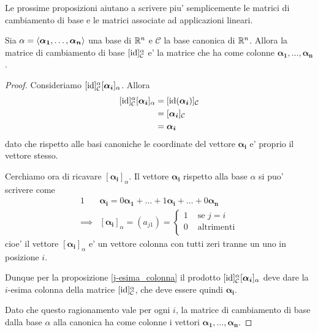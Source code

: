 Le prossime proposizioni aiutano a scrivere piu' semplicemente le matrici di cambiamento di base e le matrici associate ad applicazioni lineari.

\begin{proposition}
    Sia $\alpha = \left\langle \bm{\alpha_1}, \dots, \bm{\alpha_n} \right\rangle$ una base di $\mathbb{R}^n$ e $\mathcal{C}$ la base canonica di $\mathbb{R}^n$. Allora la matrice di cambiamento di base $[\operatorname{id}]^{\alpha}_{\mathcal{C}}$ e' la matrice che ha come colonne $\bm{\alpha_1}, \dots, \bm{\alpha_n}$.
\end{proposition}
\begin{proof}
    Consideriamo $[\operatorname{id}]^{\alpha}_{\mathcal{C}} [\bm{\alpha_i}]_{\alpha}$. Allora \begin{alignat*}
        {1}
        [\operatorname{id}]^{\alpha}_{\mathcal{C}} [\bm{\alpha_i}]_{\alpha} &= [\operatorname{id}(\bm{\alpha_i})]_{\mathcal{C}} \\
        &= [\bm{\alpha_i}]_{\mathcal{C}}\\
        &= \bm{\alpha_i}
    \end{alignat*} dato che rispetto alle basi canoniche le coordinate del vettore $\bm{\alpha_i}$ e' proprio il vettore stesso.
    
    Cerchiamo ora di ricavare $[\bm{\alpha_i}]_{\alpha}$. Il vettore $\bm{\alpha_i}$ rispetto alla base $\alpha$ si puo' scrivere come \begin{alignat*}
        {1}
        &\bm{\alpha_i} = 0\bm{\alpha_1} + \dots + 1\bm{\alpha_i} + \dots + 0\bm{\alpha_n} \\
        \implies &[\bm{\alpha_i}]_{\alpha} = (a_{j1}) = \begin{cases}
            1 & \text{ se } j = i\\
            0 & \text{ altrimenti}\\
        \end{cases}
    \end{alignat*}
    cioe' il vettore $[\bm{\alpha_i}]_{\alpha}$ e' un vettore colonna con tutti zeri tranne un uno in posizione $i$.

    Dunque per la proposizione \ref{j-esima_colonna} il prodotto $[\operatorname{id}]^{\alpha}_{\mathcal{C}} [\bm{\alpha_i}]_{\alpha}$ deve dare la $i$-esima colonna della matrice $[\operatorname{id}]^{\alpha}_{\mathcal{C}}$, che deve essere quindi $\bm{\alpha_i}$.

    Dato che questo ragionamento vale per ogni $i$, la matrice di cambiamento di base dalla base $\alpha$ alla canonica ha come colonne i vettori $\bm{\alpha_1}, \dots, \bm{\alpha_n}$.
\end{proof}
